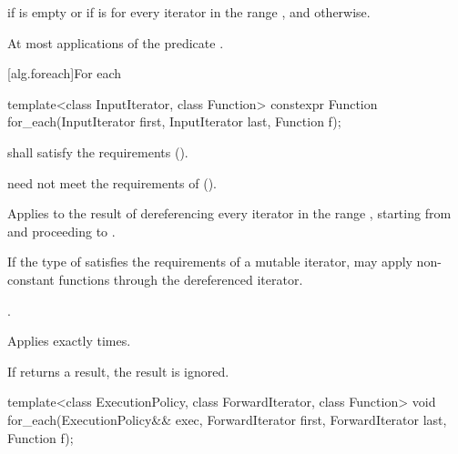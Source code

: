 \begin{itemdescr}
\pnum
\returns {} if
 is empty or if
 is  for every
iterator  in the range , and 
otherwise.

\pnum
\complexity At most  applications of the predicate
.
\end{itemdescr}

[alg.foreach]{For each}

%
\begin{itemdecl}
template<class InputIterator, class Function>
  constexpr Function for_each(InputIterator first, InputIterator last, Function f);
\end{itemdecl}

\begin{itemdescr}
\pnum
\requires {} shall satisfy the
 requirements ().
\begin{note}  need not meet the requirements of
 (). \end{note}

\pnum
\effects
Applies
 to the result of dereferencing every iterator in the range
,
starting from
and proceeding to
.
\begin{note} If the type of  satisfies the
requirements of a mutable iterator,  may apply non-constant
functions through the dereferenced iterator.\end{note}

\pnum
\returns
{}.

\pnum
\complexity
Applies 
exactly
times.

\pnum
\remarks
If  returns a result, the result is ignored.
\end{itemdescr}

%
\begin{itemdecl}
template<class ExecutionPolicy, class ForwardIterator, class Function>
  void for_each(ExecutionPolicy&& exec,
                ForwardIterator first, ForwardIterator last,
                Function f);
\end{itemdecl}

